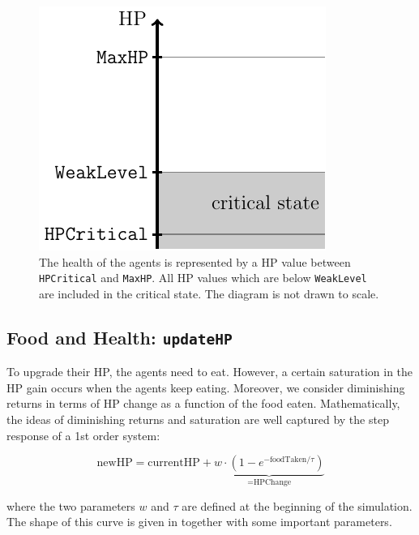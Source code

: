 \begin{figure}[htb]
    \centering
    \includegraphics[width=0.3\linewidth]{002_simulation_structure/images/health_global.pdf}
    \caption{The health of the agents is represented by a HP value between \texttt{HPCritical} and \texttt{MaxHP}. All HP values which are below \texttt{WeakLevel} are included in the critical state. The diagram is not drawn to scale.}
    \label{fig:health_system}
\end{figure}

%
%
\subsection{Food and Health: \texttt{updateHP}}\label{updateHP}
To upgrade their HP, the agents need to eat. However, a certain saturation in the HP gain occurs when the agents keep eating. Moreover, we consider diminishing returns in terms of HP change as a function of the food eaten. Mathematically, the ideas of diminishing returns and saturation are well captured by the step response of a 1st order system:

\begin{equation}\label{updateHP_general}
   \text{newHP}= \text{currentHP} +\underbrace{w\cdot(1-e^{-\text{foodTaken}/ \tau})}_{=\text{HPChange}}
\end{equation}

where the two parameters $w$ and $\tau$ are defined at the beginning of the simulation. The shape of this curve is given in  together with some important parameters.

